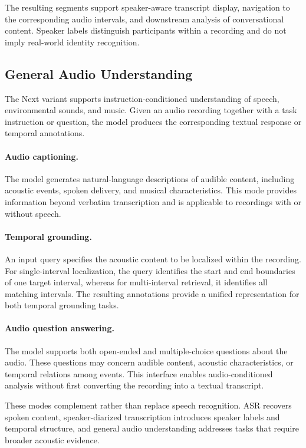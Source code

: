 \documentclass{article}
\begin{document}
The resulting segments support speaker-aware transcript display, navigation to the corresponding audio intervals, and downstream analysis of conversational content. Speaker labels distinguish participants within a recording and do not imply real-world identity recognition.

\subsection{General Audio Understanding}
\label{subsec:deployment-audio-understanding}

The Next variant supports instruction-conditioned understanding of speech, environmental sounds, and music. Given an audio recording together with a task instruction or question, the model produces the corresponding textual response or temporal annotations.

\paragraph{Audio captioning.}
The model generates natural-language descriptions of audible content, including acoustic events, spoken delivery, and musical characteristics. This mode provides information beyond verbatim transcription and is applicable to recordings with or without speech.

\paragraph{Temporal grounding.}
An input query specifies the acoustic content to be localized within the recording. For single-interval localization, the query identifies the start and end boundaries of one target interval, whereas for multi-interval retrieval, it identifies all matching intervals. The resulting annotations provide a unified representation for both temporal grounding tasks.

\paragraph{Audio question answering.}
The model supports both open-ended and multiple-choice questions about the audio. These questions may concern audible content, acoustic characteristics, or temporal relations among events. This interface enables audio-conditioned analysis without first converting the recording into a textual transcript.

These modes complement rather than replace speech recognition. ASR recovers spoken content, speaker-diarized transcription introduces speaker labels and temporal structure, and general audio understanding addresses tasks that require broader acoustic evidence.
\end{document}
